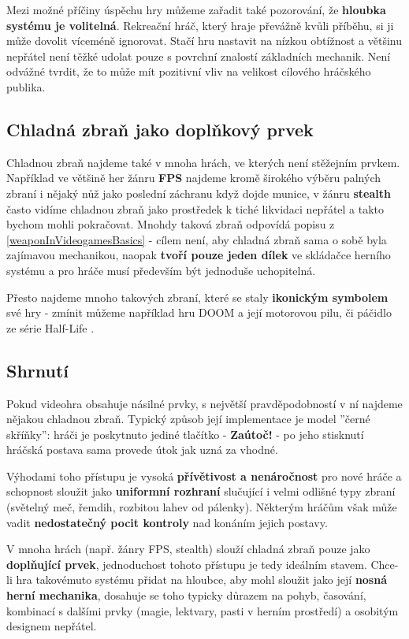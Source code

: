 Mezi možné příčiny úspěchu hry můžeme zařadit také pozorování, že \textbf{hloubka systému je volitelná}. Rekreační hráč, který hraje převážně kvůli příběhu, si ji může dovolit víceméně ignorovat. Stačí hru nastavit na nízkou obtížnost a většinu nepřátel není těžké udolat pouze s povrchní znalostí základních mechanik. Není odvážné tvrdit, že to může mít pozitivní vliv na velikost cílového hráčského publika. 

\subsection{Chladná zbraň jako doplňkový prvek}

Chladnou zbraň najdeme také v mnoha hrách, ve kterých není stěžejním prvkem. Například ve většině her žánru \textbf{\acs{FPS}} najdeme kromě širokého výběru palných zbraní i nějaký nůž jako poslední záchranu když dojde munice, v žánru \textbf{stealth} často vidíme chladnou zbraň jako prostředek k tiché likvidaci nepřátel a takto bychom mohli pokračovat. Mnohdy taková zbraň odpovídá popisu z \ref{weaponInVideogamesBasics} - cílem není, aby chladná zbraň sama o sobě byla zajímavou mechanikou, naopak \textbf{tvoří pouze jeden dílek} ve skládačce herního systému a pro hráče musí především být jednoduše uchopitelná. 

Přesto najdeme mnoho takových zbraní, které se staly \textbf{ikonickým symbolem} své hry - zmínit můžeme například hru DOOM \cite{DOOM1993} a její motorovou pilu, či páčidlo ze série Half-Life \cite{HalfLife}.


\subsection{Shrnutí}
Pokud videohra obsahuje násilné prvky, s největší pravděpodobností v ní najdeme nějakou chladnou zbraň. Typický způsob její implementace je model ''černé skříňky'': hráči je poskytnuto jediné tlačítko - \textbf{Zaútoč!} - po jeho stisknutí hráčská postava sama provede útok jak uzná za vhodné. 

Výhodami toho přístupu je vysoká \textbf{přívětivost a nenáročnost} pro nové hráče a schopnost sloužit jako \textbf{uniformní rozhraní} slučující i velmi odlišné typy zbraní (světelný meč, řemdih, rozbitou lahev od pálenky). Některým hráčům však může vadit \textbf{nedostatečný pocit kontroly} nad konáním jejich postavy.

V mnoha hrách (např. žánry \acs{FPS}, stealth) slouží chladná zbraň pouze jako \textbf{doplňující prvek}, jednoduchost tohoto přístupu je tedy ideálním stavem. Chce-li hra takovémuto systému přidat na hloubce, aby mohl sloužit jako její \textbf{nosná herní mechanika}, dosahuje se toho typicky důrazem na pohyb, časování, kombinací s dalšími prvky (magie, lektvary, pasti v herním prostředí) a osobitým designem nepřátel.

